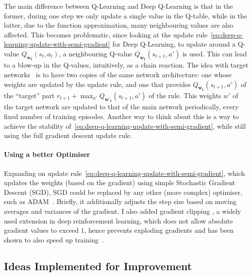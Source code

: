The main difference between Q-Learning and Deep Q-Learning is that in the former, during one step we only update a single value in the Q-table, while in the latter, due to the function approximation, many neighbouring values are also affected. This becomes problematic, since looking at the update rule~\ref{eq:deep-q-learning-update-with-semi-gradient} for Deep Q-Learning, to update around a Q-value $Q_{\mathbf{w_t}}(s_t, a_t)$, a neighbouring Q-value $Q_{\mathbf{w_t}}(s_{t+1}, a')$ is used. This can lead to a blow-up in the Q-values, intuitively, as a chain reaction. The idea with target networks~\cite{argueta1992targetnetwork} is to have two copies of the same network architecture: one whose weights are updated by the update rule, and one that provides $Q_{\mathbf{w_t}}(s_{t+1}, a')$ of the ``target'' part $r_{t+1}+ \max_{a'} Q_{\mathbf{w'_t}}(s_{t+1}, a')$ of the rule. This weights $w'$ of the target network are updated to that of the main network periodically, every fixed number of training episodes. Another way to think about this is  a way to achieve the stability of~\ref{eq:deep-q-learning-update-with-semi-gradient}, while still using the full gradient descent update rule.


\paragraph{Using a better Optimiser}


Expanding on update rule~\ref{eq:deep-q-learning-update-with-semi-gradient}, which updates the weights (based on the gradient) using simple Stochastic Gradient Descent (SGD), SGD could be replaced by any other (more complex) optimiser, such as ADAM~\cite{kingma2015adamoptimiser}. Briefly, it additionally adjusts the step size based on moving averages and variances of the gradient. I also added gradient clipping \cite{mikolov2012gradientclippingoriginal}, a widely used extension in deep reinforcement learning, which does not allow absolute gradient values to exceed $1$, hence prevents exploding gradients and has been shown to also speed up training~\cite{zhang2020gradientclippingaccelerate}.



\subsection{Ideas Implemented for Improvement} \label{improvementideas}


